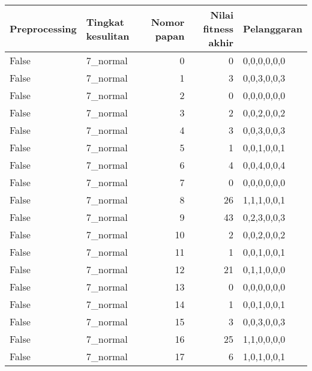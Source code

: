 \begin{tabular}{llrrl}
\hline
 Preprocessing   & Tingkat kesulitan   &   Nomor papan &   Nilai fitness akhir & Pelanggaran   \\
\hline
 False           & 7\_normal            &             0 &                     0 & 0,0,0,0,0,0   \\
 False           & 7\_normal            &             1 &                     3 & 0,0,3,0,0,3   \\
 False           & 7\_normal            &             2 &                     0 & 0,0,0,0,0,0   \\
 False           & 7\_normal            &             3 &                     2 & 0,0,2,0,0,2   \\
 False           & 7\_normal            &             4 &                     3 & 0,0,3,0,0,3   \\
 False           & 7\_normal            &             5 &                     1 & 0,0,1,0,0,1   \\
 False           & 7\_normal            &             6 &                     4 & 0,0,4,0,0,4   \\
 False           & 7\_normal            &             7 &                     0 & 0,0,0,0,0,0   \\
 False           & 7\_normal            &             8 &                    26 & 1,1,1,0,0,1   \\
 False           & 7\_normal            &             9 &                    43 & 0,2,3,0,0,3   \\
 False           & 7\_normal            &            10 &                     2 & 0,0,2,0,0,2   \\
 False           & 7\_normal            &            11 &                     1 & 0,0,1,0,0,1   \\
 False           & 7\_normal            &            12 &                    21 & 0,1,1,0,0,0   \\
 False           & 7\_normal            &            13 &                     0 & 0,0,0,0,0,0   \\
 False           & 7\_normal            &            14 &                     1 & 0,0,1,0,0,1   \\
 False           & 7\_normal            &            15 &                     3 & 0,0,3,0,0,3   \\
 False           & 7\_normal            &            16 &                    25 & 1,1,0,0,0,0   \\
 False           & 7\_normal            &            17 &                     6 & 1,0,1,0,0,1   \\

\end{tabular}
